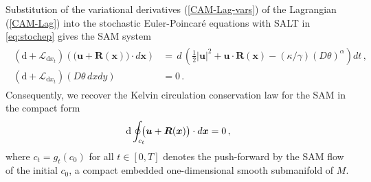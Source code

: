\documentclass[11pt, oneside]{article}   	%
\numberwithin{equation}{section}
\theoremstyle{plain}
\theoremstyle{definition}
\theoremstyle{remark}
\newcommand{\<}{\langle}
\renewcommand{\>}{\rangle}
\def\rmd{{\mathrm{d}}}
\newcommand{\bs}[1]{\boldsymbol{#1}}
\begin{document}
Substitution of the variational derivatives (\ref{CAM-Lag-vars}) of
the Lagrangian (\ref{CAM-Lag}) into the stochastic Euler-Poincar\'e equations
with SALT in \eqref{eq:stochep} gives the SAM system
 \begin{align}
\begin{split}
\left({\rmd} + \mathcal{L}_{{\rmd}x_t}\right) \left( \big( \bs{u} + \bs{R}(\bs{x}) \big) \cdot d\bs{x} \right)
 &=  \,{d\,}\left(\frac{1}{2} |\bs{u}|^2 +  \bs{u}\cdot\bs{R}(\bs{x}) -(\kappa/\gamma) (D\theta)^{\alpha} \right) dt
\,,\\
({\rmd} + \mathcal{L}_{{\rmd}x_t}) (D\theta \,dxdy) & =  0
\,.
\end{split}
\label{EPSD-geom-CAM}
\end{align}
%
Consequently, we recover the Kelvin circulation conservation law for the SAM in the compact form
\begin{align}
{\rmd}\oint_{c_t}\hspace{-2mm} 
 \big( \bs{u} + \bs{R}(\bs{x}) \big) \cdot d \bs{x} 
=
0 
\,,
\label{SAM-circons}
\end{align}
where $c_t=g_t(c_0)$ for all $t\in [0,T]$ denotes the push-forward by the SAM flow of the initial $c_0$,
a compact embedded one-dimensional smooth submanifold of $M$.
\end{document}
